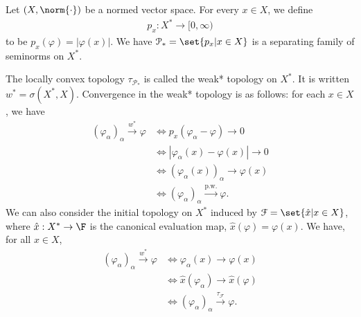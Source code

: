 \documentclass[10pt]{mypackage}
\begin{document}
\begin{example}
  Let $\left(X,\norm{\cdot}\right)$ be a normed vector space. For every $x\in X$, we define
  \begin{align*}
    p_x: X^{\ast}\rightarrow [0,\infty)
  \end{align*}
  to be $p_x\left(\varphi\right) = \left\vert \varphi\left(x\right) \right\vert$. We have $\mathcal{P}_{\ast} = \set{p_x| x\in X}$ is a separating family of seminorms on $X^{\ast}$.\newline

  The locally convex topology $\tau_{\mathcal{P}_{\ast}}$ is called the weak* topology on $X^{\ast}$. It is written $w^{\ast} = \sigma\left(X^{\ast},X\right)$. Convergence in the weak* topology is as follows: for each $x\in X$, we have
  \begin{align*}
    \left(\varphi_{\alpha}\right)_{\alpha}\xrightarrow{w^{\ast}}\varphi &\Leftrightarrow p_x\left(\varphi_{\alpha} - \varphi\right) \rightarrow 0\\
                                                                        &\Leftrightarrow \left\vert \varphi_{\alpha}(x) - \varphi(x) \right\vert\rightarrow 0\\
                                                                        &\Leftrightarrow \left(\varphi_{\alpha}(x)\right)_{\alpha}\rightarrow \varphi(x)\\
                                                                        &\Leftrightarrow \left(\varphi_{\alpha}\right)_{\alpha}\xrightarrow{\text{p.w.}}\varphi.
  \end{align*}
  We can also consider the initial topology on $X^{\ast}$ induced by $\mathcal{F} = \set{\hat{x} | x\in X}$, where $\hat{x}: X^{\ast}\rightarrow \F$ is the canonical evaluation map, $\hat{x}\left(\varphi\right) = \varphi(x)$. We have, for all $x\in X$,
  \begin{align*}
    \left(\varphi_{\alpha}\right)_{\alpha}\xrightarrow{w^{\ast}} \varphi &\Leftrightarrow \varphi_{\alpha}\left(x\right) \rightarrow \varphi\left(x\right)\\
                                                                         &\Leftrightarrow \hat{x}\left(\varphi_{\alpha}\right)\rightarrow \hat{x}\left(\varphi\right)\\
                                                                         &\Leftrightarrow \left(\varphi_{\alpha}\right)_{\alpha}\xrightarrow{\tau_{\mathcal{F}}}\varphi.
  \end{align*}

\end{example}
\end{document}
